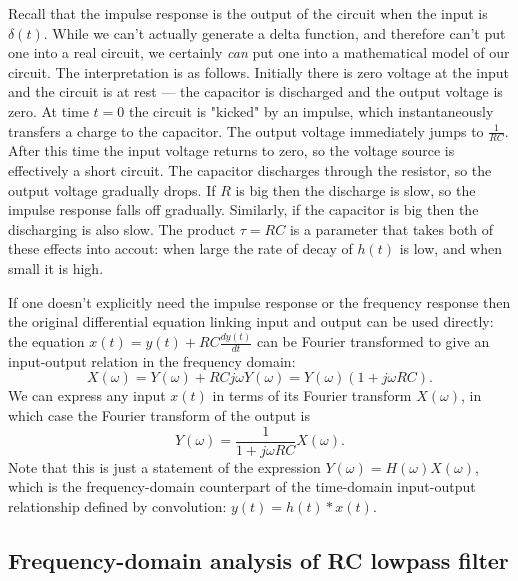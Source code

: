\documentclass[10pt]{beamer}
\newcommand{\conv}{\ast}
\begin{document}
Recall that the impulse response is the output of the circuit when the input is $\delta(t)$.  While we can't actually generate a delta function, and therefore can't put one into a real circuit, we certainly {\em can} put one into a mathematical model of our circuit.  The interpretation is as follows.  Initially there is zero voltage at the input and the circuit is at rest --- the capacitor is discharged and the output voltage is zero.  At time $t=0$ the circuit is "kicked" by an impulse, which instantaneously transfers a charge to the capacitor.  The output voltage immediately jumps to $\frac{1}{RC}$.  After this time the input voltage returns to zero, so the voltage source is effectively a short circuit.  The capacitor discharges through the resistor, so the output voltage gradually drops.  If $R$ is big then the discharge is slow, so the impulse response falls off gradually.  Similarly, if the capacitor is big then the discharging is also slow.  The product $\tau = RC$ is a parameter that takes both of these effects into accout:  when large the rate of decay of $h(t)$ is low, and when small it is high.  

If one doesn't explicitly need the impulse response or the frequency response then the original differential equation linking input and output can be used directly:  the equation $x(t) = y(t) + R C \frac{dy(t)}{dt}$ can be Fourier transformed to give an input-output relation in the frequency domain:
\begin{equation*}
  X(\omega) = Y(\omega) + RC j \omega Y(\omega) = Y(\omega) (1 + j \omega RC).
\end{equation*}
We can express any input $x(t)$ in terms of its Fourier transform $X(\omega)$, in which case the Fourier transform of the output is
\begin{equation*}
  Y(\omega) = \frac{1}{1 + j \omega RC} X(\omega).
\end{equation*}
Note that this is just a statement of the expression $Y(\omega) = H(\omega) X(\omega)$, which is the frequency-domain counterpart of the time-domain input-output relationship defined by convolution:  $y(t) = h(t) \conv x(t)$.

\subsection{Frequency-domain analysis of RC lowpass filter}
\end{document}
